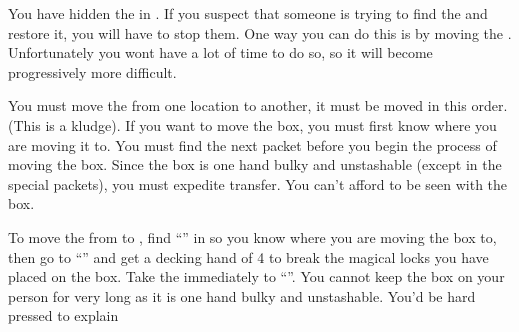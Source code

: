 \documentclass[green]{NeptuneBall}
\begin{document}
\name{\gMoveMusicBox{}}

You have hidden the \iMusicBox{} in \sPacketA{\MYloc{}}. If you suspect that someone is trying to find the \iMusicBox{} and restore it, you will have to stop them. One way you can do this is by moving the \iMusicBox{}. Unfortunately you wont have a lot of time to do so, so it will become progressively more difficult. 

You must move the \iMusicBox{} from one location to another, it must be moved in this order. (This is a kludge). If you want to move the box, you must first know where you are moving it to. You must find the next packet before you begin the process of moving the box. Since the box is one hand bulky and unstashable (except in the special packets), you must expedite transfer. You can't afford to be seen with the box.

To move the \iMusicBox{} from \sPacketA{\MYloc{}} to \sPacketB{\MYloc{}}, find ``\sPacketB{}'' in \sPacketB{\MYloc{}} so you know where you are moving the box to, then go to ``\sPacketA{}'' and get a decking hand of 4 to break the magical locks you have placed on the box. Take the \iMusicBox{} immediately to ``\sPacketB{}''. You cannot keep the box on your person for very long as it is one hand bulky and unstashable. You'd be hard pressed to explain
\end{document}
